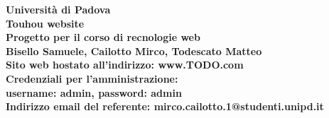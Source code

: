 \documentclass[openany, a4paper, 12pt]{report}
\begin{document}
	\begin{titlepage}
		\centering
		\vfill
		{
			\bfseries
			\vskip2cm
			\Large Università di Padova\\
			\vfill
			\Huge Touhou website\\
			\Large Progetto per il corso di recnologie web\\
			\vfill
			\large Bisello Samuele, Cailotto Mirco, Todescato Matteo\\
			\vfill
			Sito web hostato all'indirizzo: www.TODO.com\\ %
			Credenziali per l'amministrazione:\\username: admin, password: admin\\
			Indirizzo email del referente: mirco.cailotto.1@studenti.unipd.it\\
			\vfill
		}
	\end{titlepage}
	\tableofcontents
	\newpage




\end{document}

